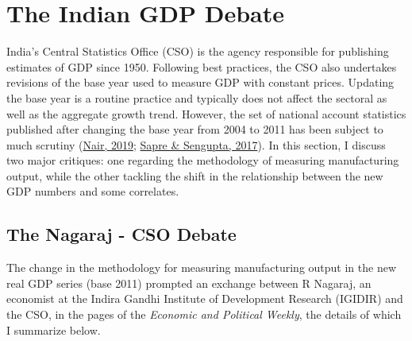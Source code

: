 \documentclass[12pt,nobind, a4paper]{reedthesis}
\begin{document}
 \hypertarget{deb}{%
 \section{The Indian GDP Debate}\label{deb}}

 India's Central Statistics Office (CSO) is the agency responsible for publishing estimates of GDP since 1950. Following best practices, the CSO also undertakes revisions of the base year used to measure GDP with constant prices. Updating the base year is a routine practice and typically does not affect the sectoral as well as the aggregate growth trend. However, the set of national account statistics published after changing the base year from 2004 to 2011 has been subject to much scrutiny (\protect\hyperlink{ref-nair_base_2019}{Nair, 2019}; \protect\hyperlink{ref-sapre_analysis_2017}{Sapre \& Sengupta, 2017}). In this section, I discuss two major critiques: one regarding the methodology of measuring manufacturing output, while the other tackling the shift in the relationship between the new GDP numbers and some correlates.

 \hypertarget{the-nagaraj---cso-debate}{%
 \subsection{The Nagaraj - CSO Debate}\label{the-nagaraj---cso-debate}}

 The change in the methodology for measuring manufacturing output in the new real GDP series (base 2011) prompted an exchange between R Nagaraj, an economist at the Indira Gandhi Institute of Development Research (IGIDIR) and the CSO, in the pages of the \emph{Economic and Political Weekly}, the details of which I summarize below.
 \linebreak
\end{document}
